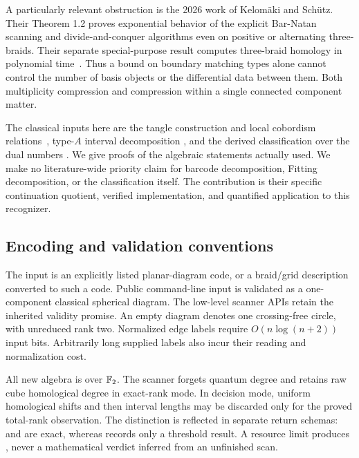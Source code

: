 A particularly relevant obstruction is the 2026 work of Kelom\"aki and
Sch\"utz. Their Theorem 1.2 proves exponential behavior of the explicit
Bar-Natan scanning and divide-and-conquer algorithms even on positive or
alternating three-braids. Their separate special-purpose result computes
three-braid homology in polynomial time~\cite{kelomaki}. Thus a bound on
boundary matching types alone cannot control the number of basis objects or
the differential data between them. Both multiplicity compression and
compression within a single connected component matter.

The classical inputs here are the tangle construction and local cobordism
relations~\cite{khovanov,barnatan}, type-$A$ interval decomposition
\cite{carlsson}, and the derived classification over the dual numbers
\cite{keller}. We give proofs of the algebraic statements actually used.
We make no literature-wide priority claim for barcode decomposition, Fitting
decomposition, or the classification itself. The contribution is their
specific continuation quotient, verified implementation, and quantified
application to this recognizer.

\subsection{Encoding and validation conventions}
The input is an explicitly listed planar-diagram code, or a braid/grid
description converted to such a code. Public command-line input is validated
as a one-component classical spherical diagram. The low-level scanner APIs
retain the inherited validity promise. An empty diagram denotes one
crossing-free circle, with unreduced rank two. Normalized edge labels require
$O(n\log(n+2))$ input bits. Arbitrarily long supplied labels also incur their
reading and normalization cost.

All new algebra is over $\mathbb F_2$. The scanner forgets quantum degree and retains
raw cube homological degree in exact-rank mode. In decision mode, uniform
homological shifts and then interval lengths may be discarded only for the
proved total-rank observation. The distinction is reflected in separate
return schemas:  and  are exact, whereas
 records only a threshold result. A resource limit produces
\UNKNOWN, never a mathematical verdict inferred from an unfinished scan.
